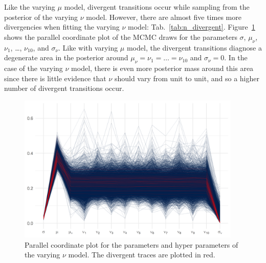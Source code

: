 

Like the varying $\mu$ model, divergent transitions occur while sampling from the posterior of the varying $\nu$ model. However, there are almost five times more divergencies when fitting the varying $\nu$ model: Tab.~\ref{tab:n_divergent}. Figure~\ref{fig:pp_nu_parcoord} shows the parallel coordinate plot of the MCMC draws for the parameters $\sigma$, $\mu_\nu$, $\nu_1$, \ldots, $\nu_{10}$, and $\sigma_\nu$. Like with varying $\mu$ model, the divergent transitions diagnose a degenerate area in the posterior around $\mu_\nu = \nu_1 = \ldots = \nu_{10}$ and $\sigma_\nu = 0$. In the case of the varying $\nu$ model, there is even more posterior mass around this area since there is little evidence that $\nu$ should vary from unit to unit, and so a higher number of divergent transitions occur.

\begin{figure}
   \centering
   \includegraphics[width=0.95\textwidth]{./figures/ch-5/plot-pp-nu-parcoord.png}
   \caption{Parallel coordinate plot for the parameters and hyper parameters of the varying $\nu$ model. The divergent traces are plotted in red.}
   \label{fig:pp_nu_parcoord} 
\end{figure}

